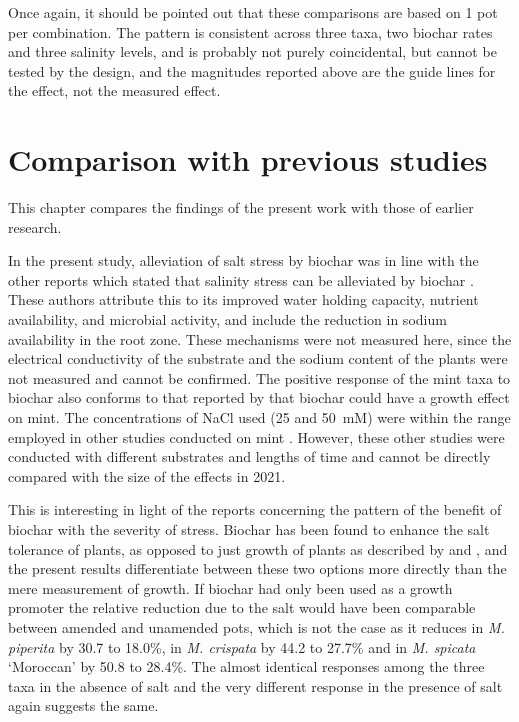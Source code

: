 Once again, it should be pointed out that these comparisons are based on 1 pot per combination. The pattern is consistent across three taxa, two biochar rates and three salinity levels, and is probably not purely coincidental, but cannot be tested by the design, and the magnitudes reported above are the guide lines for the effect, not the measured effect.

\section{Comparison with previous studies}

This chapter compares the findings of the present work with those of earlier research.

In the present study, alleviation of salt stress by biochar was in line with the other reports which stated that salinity stress can be alleviated by biochar \parencite{Farhangi2017, Akhtar2021}. These authors attribute this to its improved water holding capacity, nutrient availability, and microbial activity, and \textcite{Joseph2021} include the reduction in sodium availability in the root zone. These mechanisms were not measured here, since the electrical conductivity of the substrate and the sodium content of the plants were not measured and cannot be confirmed. The positive response of the mint taxa to biochar also conforms to that reported by \textcite{Zheljazkov2019} that biochar could have a growth effect on mint. The concentrations of NaCl used (25 and 50~mM) were within the range employed in other studies conducted on mint \parencite{Morshedloo2025, Ounoki2021}. However, these other studies were conducted with different substrates and lengths of time and cannot be directly compared with the size of the effects in 2021.

This is interesting in light of the reports concerning the pattern of the benefit of biochar with the severity of stress. Biochar has been found to enhance the salt tolerance of plants, as opposed to just growth of plants as described by \textcite{Farhangi2017} and \textcite{Akhtar2021}, and the present results differentiate between these two options more directly than the mere measurement of growth. If biochar had only been used as a growth promoter the relative reduction due to the salt would have been comparable between amended and unamended pots, which is not the case as it reduces in \textit{M. piperita} by 30.7 to 18.0\%, in \textit{M. crispata} by 44.2 to 27.7\% and in \textit{M. spicata} `Moroccan' by 50.8 to 28.4\%. The almost identical responses among the three taxa in the absence of salt and the very different response in the presence of salt again suggests the same.

